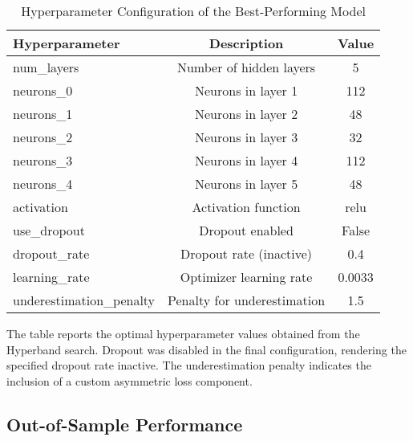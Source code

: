 \begin{table}[H]
	\centering
	\begin{threeparttable}
		\caption{Hyperparameter Configuration of the Best-Performing Model}
		\label{tab:best_hyperparameters}
		\begin{tabular}{lcc}
			\toprule
			\textbf{Hyperparameter}  & \textbf{Description}        & \textbf{Value} \\
			\midrule
			num\_layers              & Number of hidden layers     & 5              \\
			neurons\_0               & Neurons in layer 1          & 112            \\
			neurons\_1               & Neurons in layer 2          & 48             \\
			neurons\_2               & Neurons in layer 3          & 32             \\
			neurons\_3               & Neurons in layer 4          & 112            \\
			neurons\_4               & Neurons in layer 5          & 48             \\
			activation               & Activation function         & \ac{relu}      \\
			use\_dropout             & Dropout enabled             & False          \\
			dropout\_rate            & Dropout rate (inactive)     & 0.4            \\
			learning\_rate           & Optimizer learning rate     & 0.0033         \\
			underestimation\_penalty & Penalty for underestimation & 1.5            \\
			\bottomrule
		\end{tabular}
		\begin{tablenotes}
			\footnotesize
			\item The table reports the optimal hyperparameter values obtained from the Hyperband search. Dropout was disabled in the final configuration, rendering the specified dropout rate inactive. The underestimation penalty indicates the inclusion of a custom asymmetric loss component.
		\end{tablenotes}
	\end{threeparttable}
\end{table}

\subsection{Out-of-Sample Performance}
